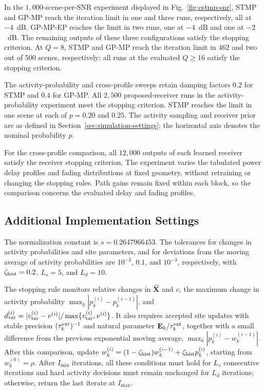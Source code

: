 In the $1{,}000$-scene-per-SNR experiment displayed in
Fig.~\ref{fig:cstmp-snr}, STMP and GP-MP reach the iteration limit
in one and three runs, respectively, all at $-4$~dB. GP-MP-EP reaches
the limit in two runs, one at $-4$~dB and one at $-2$~dB. The remaining
outputs of these three configurations satisfy the stopping criterion.
At $Q=8$, STMP and GP-MP reach the iteration limit in
$462$ and two out of $500$ scenes, respectively;
all runs at the evaluated $Q\geq16$ satisfy the stopping criterion.

The activity-probability and cross-profile sweeps retain damping factors $0.2$
for STMP and $0.4$ for GP-MP. All $2{,}500$ proposed-receiver
runs in the activity-probability experiment meet the stopping criterion. STMP reaches the limit in one
scene at each of $p=0.20$ and $0.25$.
The activity sampling and receiver prior are as defined in
Section~\ref{sec:simulation-settings}; the horizontal axis denotes
the nominal probability $p$.

For the cross-profile comparison, all $12{,}000$ outputs of each learned
receiver satisfy the receiver stopping criterion.
The experiment varies the tabulated power delay profiles and
fading distributions at fixed geometry, without retraining or changing the
stopping rules. Path gains remain fixed within each block, so the comparison concerns
the evaluated delay and fading profiles.

\subsection{Additional Implementation Settings}
\label{app:implementation-settings}

The normalization constant is $s=0.2647966453$.
The tolerances for changes in activity probabilities and site parameters,
and for deviations from the moving average of activity probabilities
are $10^{-3}$, $0.1$, and $10^{-3}$, respectively, with
$\zeta_{\rm hist}=0.2$, $L_s=5$, and $L_d=10$.

The stopping rule monitors relative changes in $\widehat{\mathbf X}$ and $v$,
the maximum change in activity probability $\max_k|p_k^{(i)}-p_k^{(i-1)}|$, and
$d_{\rm var}^{(i)}=|v_{\rm tar}^{(i)}-v^{(i)}|/
\max\{v_{\rm tar}^{(i)},v^{(i)}\}$.
It also requires accepted site updates with stable precision
$(\tau_k^{\rm ext})^{-1}$ and natural parameter $\mathbf E_k/\tau_k^{\rm ext}$, together with a small difference from the previous exponential moving average, $\max_k|p_k^{(i)}-w_k^{(i-1)}|$.
After this comparison, update
$w_k^{(i)}=(1-\zeta_{\rm hist})w_k^{(i-1)}+\zeta_{\rm hist} p_k^{(i)}$, starting from
$w_k^{(0)}=\rho$.
After $I_{\min}$ iterations, all these conditions must hold for $L_s$
consecutive iterations and hard activity decisions must remain unchanged
for $L_d$ iterations; otherwise, return the last iterate at $I_{\max}$.

